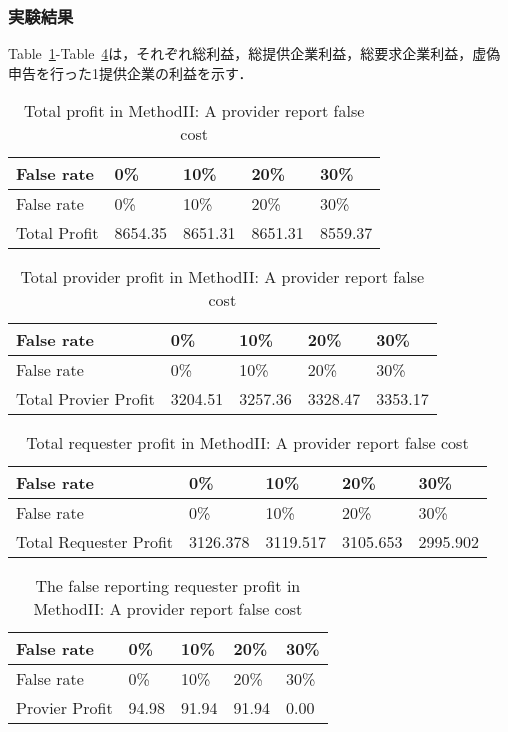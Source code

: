\hypertarget{ux5b9fux9a13ux7d50ux679c-4}{%
\subsubsection{実験結果}\label{ux5b9fux9a13ux7d50ux679c-4}}

Table~\ref{tbl:m2-2-total-profit}-Table~\ref{tbl:m2-2-false-provider-profit}は，それぞれ総利益，総提供企業利益，総要求企業利益，虚偽申告を行った1提供企業の利益を示す．

\hypertarget{tbl:m2-2-total-profit}{}
\begin{longtable}[H]{@{}lllll@{}}
\caption{\label{tbl:m2-2-total-profit}Total profit in MethodII: A
provider report false cost}\tabularnewline
\toprule
False rate & 0\% & 10\% & 20\% & 30\%\tabularnewline
\midrule
\endfirsthead
\toprule
False rate & 0\% & 10\% & 20\% & 30\%\tabularnewline
\midrule
\endhead
Total Profit & 8654.35 & 8651.31 & 8651.31 & 8559.37\tabularnewline
\bottomrule
\end{longtable}

\hypertarget{tbl:m2-2-total-provider-profit}{}
\begin{longtable}[H]{@{}lllll@{}}
\caption{\label{tbl:m2-2-total-provider-profit}Total provider profit in
MethodII: A provider report false cost}\tabularnewline
\toprule
False rate & 0\% & 10\% & 20\% & 30\%\tabularnewline
\midrule
\endfirsthead
\toprule
False rate & 0\% & 10\% & 20\% & 30\%\tabularnewline
\midrule
\endhead
Total Provier Profit & 3204.51 & 3257.36 & 3328.47 &
3353.17\tabularnewline
\bottomrule
\end{longtable}

\hypertarget{tbl:m2-2-total-requester-profit}{}
\begin{longtable}[H]{@{}lllll@{}}
\caption{\label{tbl:m2-2-total-requester-profit}Total requester profit
in MethodII: A provider report false cost}\tabularnewline
\toprule
False rate & 0\% & 10\% & 20\% & 30\%\tabularnewline
\midrule
\endfirsthead
\toprule
False rate & 0\% & 10\% & 20\% & 30\%\tabularnewline
\midrule
\endhead
Total Requester Profit & 3126.378 & 3119.517 & 3105.653 &
2995.902\tabularnewline
\bottomrule
\end{longtable}

\hypertarget{tbl:m2-2-false-provider-profit}{}
\begin{longtable}[H]{@{}lllll@{}}
\caption{\label{tbl:m2-2-false-provider-profit}The false reporting
requester profit in MethodII: A provider report false
cost}\tabularnewline
\toprule
False rate & 0\% & 10\% & 20\% & 30\%\tabularnewline
\midrule
\endfirsthead
\toprule
False rate & 0\% & 10\% & 20\% & 30\%\tabularnewline
\midrule
\endhead
Provier Profit & 94.98 & 91.94 & 91.94 & 0.00\tabularnewline
\bottomrule
\end{longtable}

